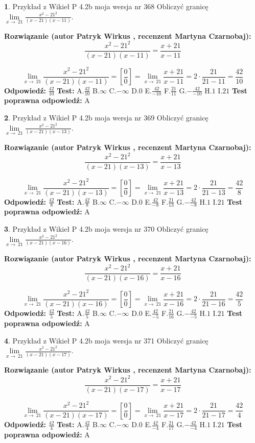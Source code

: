 \documentclass[12pt, a4paper]{article}
\theoremstyle{definition} %
\newtheorem{zad}{}
\newcommand{\zadStart}[1]{\begin{zad}#1\newline}
\newcommand{\zadStop}{\end{zad}}
\newcommand{\rozwStart}[2]{\noindent \textbf{Rozwiązanie (autor #1 , recenzent #2): }\newline}
\newcommand{\rozwStop}{\newline}
\newcommand{\odpStart}{\noindent \textbf{Odpowiedź:}\newline}
\newcommand{\odpStop}{\newline}
\newcommand{\testStart}{\noindent \textbf{Test:}\newline}
\newcommand{\testStop}{\newline}
\newcommand{\kluczStart}{\noindent \textbf{Test poprawna odpowiedź:}\newline}
\newcommand{\kluczStop}{\newline}
\begin{document}
\zadStart{Przykład z Wikieł P 4.2b moja wersja nr 368}
Obliczyć granicę $\lim\limits_{x\to\ 21}\frac{x^{2}-21^{2}}{(x-21)(x-11)}$.
\zadStop
\rozwStart{Patryk Wirkus}{Martyna Czarnobaj}
$$\frac{x^{2}-21^{2}}{(x-21)(x-11)}=\frac{x+21}{x-11}$$

$$\lim\limits_{x\to\ 21}\frac{x^{2}-21^{2}}{(x-21)(x-11)}=[\frac{0}{0}]=\lim\limits_{x\to\ 21}\frac{x+21}{x-11}=2 \cdot \frac{21}{21-11} = \frac{42}{10}$$
\rozwStop
\odpStart
$\frac{42}{10}$
\odpStop
\testStart
A.$\frac{42}{10}$
B.$\infty$
C.$-\infty$
D.$0$
E.$\frac{42}{-10}$
F.$\frac{21}{11}$
G.$-\frac{42}{-10}$
H.$1$
I.$21$
\testStop
\kluczStart
A
\kluczStop



\zadStart{Przykład z Wikieł P 4.2b moja wersja nr 369}
Obliczyć granicę $\lim\limits_{x\to\ 21}\frac{x^{2}-21^{2}}{(x-21)(x-13)}$.
\zadStop
\rozwStart{Patryk Wirkus}{Martyna Czarnobaj}
$$\frac{x^{2}-21^{2}}{(x-21)(x-13)}=\frac{x+21}{x-13}$$

$$\lim\limits_{x\to\ 21}\frac{x^{2}-21^{2}}{(x-21)(x-13)}=[\frac{0}{0}]=\lim\limits_{x\to\ 21}\frac{x+21}{x-13}=2 \cdot \frac{21}{21-13} = \frac{42}{8}$$
\rozwStop
\odpStart
$\frac{42}{8}$
\odpStop
\testStart
A.$\frac{42}{8}$
B.$\infty$
C.$-\infty$
D.$0$
E.$\frac{42}{-8}$
F.$\frac{21}{13}$
G.$-\frac{42}{-8}$
H.$1$
I.$21$
\testStop
\kluczStart
A
\kluczStop



\zadStart{Przykład z Wikieł P 4.2b moja wersja nr 370}
Obliczyć granicę $\lim\limits_{x\to\ 21}\frac{x^{2}-21^{2}}{(x-21)(x-16)}$.
\zadStop
\rozwStart{Patryk Wirkus}{Martyna Czarnobaj}
$$\frac{x^{2}-21^{2}}{(x-21)(x-16)}=\frac{x+21}{x-16}$$

$$\lim\limits_{x\to\ 21}\frac{x^{2}-21^{2}}{(x-21)(x-16)}=[\frac{0}{0}]=\lim\limits_{x\to\ 21}\frac{x+21}{x-16}=2 \cdot \frac{21}{21-16} = \frac{42}{5}$$
\rozwStop
\odpStart
$\frac{42}{5}$
\odpStop
\testStart
A.$\frac{42}{5}$
B.$\infty$
C.$-\infty$
D.$0$
E.$\frac{42}{-5}$
F.$\frac{21}{16}$
G.$-\frac{42}{-5}$
H.$1$
I.$21$
\testStop
\kluczStart
A
\kluczStop



\zadStart{Przykład z Wikieł P 4.2b moja wersja nr 371}
Obliczyć granicę $\lim\limits_{x\to\ 21}\frac{x^{2}-21^{2}}{(x-21)(x-17)}$.
\zadStop
\rozwStart{Patryk Wirkus}{Martyna Czarnobaj}
$$\frac{x^{2}-21^{2}}{(x-21)(x-17)}=\frac{x+21}{x-17}$$

$$\lim\limits_{x\to\ 21}\frac{x^{2}-21^{2}}{(x-21)(x-17)}=[\frac{0}{0}]=\lim\limits_{x\to\ 21}\frac{x+21}{x-17}=2 \cdot \frac{21}{21-17} = \frac{42}{4}$$
\rozwStop
\odpStart
$\frac{42}{4}$
\odpStop
\testStart
A.$\frac{42}{4}$
B.$\infty$
C.$-\infty$
D.$0$
E.$\frac{42}{-4}$
F.$\frac{21}{17}$
G.$-\frac{42}{-4}$
H.$1$
I.$21$
\testStop
\kluczStart
A
\kluczStop
\end{document}
